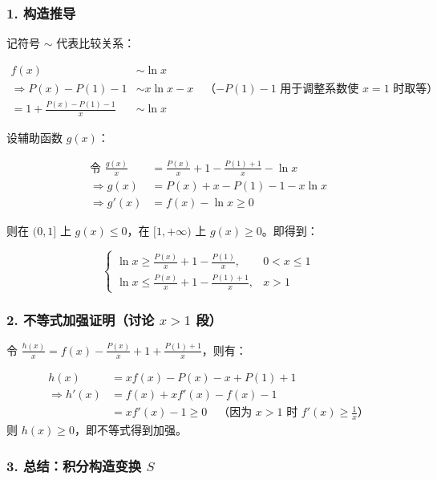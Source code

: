 \documentclass[12pt]{article}
\theoremstyle{definition}
\theoremstyle{plain}
\theoremstyle{definition}
\begin{document}
\subsubsection*{1. 构造推导}

记符号 $\sim$ 代表比较关系：

\begin{align*}
    f(x) &\sim \ln x \\
    \Rightarrow P(x) - P(1) - 1 &\sim x\ln x - x \quad \text{（$-P(1)-1$ 用于调整系数使 $x=1$ 时取等）} \\
    = 1 + \frac{P(x) - P(1) - 1}{x} &\sim \ln x
\end{align*}

设辅助函数 $g(x)$：

\begin{align*}
    \text{令 } \frac{g(x)}{x} &= \frac{P(x)}{x} + 1 - \frac{P(1) + 1}{x} - \ln x \\
    \Rightarrow g(x) &= P(x) + x - P(1) - 1 - x\ln x \\
    \Rightarrow g'(x) &= f(x) - \ln x \geq 0
\end{align*}

则在 $(0,1]$ 上 $g(x) \leq 0$，在 $[1, +\infty)$ 上 $g(x) \geq 0$。即得到：

\[
\begin{cases} 
    \ln x \geq \frac{P(x)}{x} + 1 - \frac{P(1)}{x}, & 0 < x \leq 1 \\
    \ln x \leq \frac{P(x)}{x} + 1 - \frac{P(1) + 1}{x}, & x > 1 
\end{cases}
\]

\subsubsection*{2. 不等式加强证明（讨论 $x > 1$ 段）}

令 $\frac{h(x)}{x} = f(x) - \frac{P(x)}{x} + 1 + \frac{P(1) + 1}{x}$，则有：

\begin{align*}
    h(x) &= xf(x) - P(x) - x + P(1) + 1 \\
    \Rightarrow h'(x) &= f(x) + xf'(x) - f(x) - 1 \\
    &= xf'(x) - 1 \geq 0 \quad \text{（因为 $x>1$ 时 $f'(x) \geq \frac{1}{x}$）}
\end{align*}
则 $h(x) \geq 0$，即不等式得到加强。

\subsubsection*{3. 总结：积分构造变换 $S$}
\end{document}
